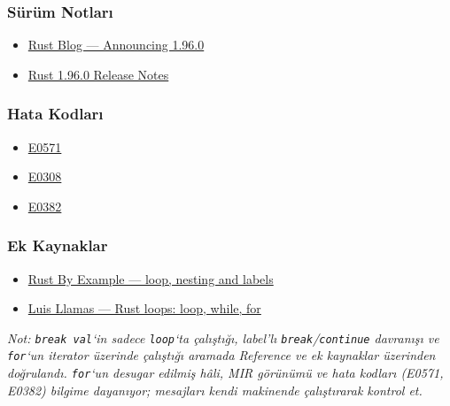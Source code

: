 \documentclass[12pt,a4paper]{article}
\begin{document}
\subsubsection{Sürüm Notları}\label{sürüm-notları-8}

\begin{itemize}
\tightlist
\item
  \href{https://blog.rust-lang.org/2026/05/28/Rust-1.96.0/}{Rust Blog --- Announcing 1.96.0}
\item
  \href{https://doc.rust-lang.org/stable/releases.html\#version-1960-2026-05-28}{Rust 1.96.0 Release Notes}
\end{itemize}

\subsubsection{Hata Kodları}\label{hata-kodları-8}

\begin{itemize}
\tightlist
\item
  \href{https://doc.rust-lang.org/error_codes/E0571.html}{E0571}
\item
  \href{https://doc.rust-lang.org/error_codes/E0308.html}{E0308}
\item
  \href{https://doc.rust-lang.org/error_codes/E0382.html}{E0382}
\end{itemize}

\subsubsection{Ek Kaynaklar}\label{ek-kaynaklar-8}

\begin{itemize}
\tightlist
\item
  \href{https://doc.rust-lang.org/rust-by-example/flow_control/loop/nested.html}{Rust By Example --- loop, nesting and labels}
\item
  \href{https://www.luisllamas.es/en/rust-loops-while-for/}{Luis Llamas --- Rust loops: loop, while, for}
\end{itemize}

\emph{Not: \texttt{break\ val}`in sadece \texttt{loop}`ta çalıştığı, label'lı \texttt{break}/\texttt{continue} davranışı ve \texttt{for}`un iterator üzerinde çalıştığı aramada Reference ve ek kaynaklar üzerinden doğrulandı. \texttt{for}`un desugar edilmiş hâli, MIR görünümü ve hata kodları (E0571, E0382) bilgime dayanıyor; mesajları kendi makinende çalıştırarak kontrol et.}
\end{document}
